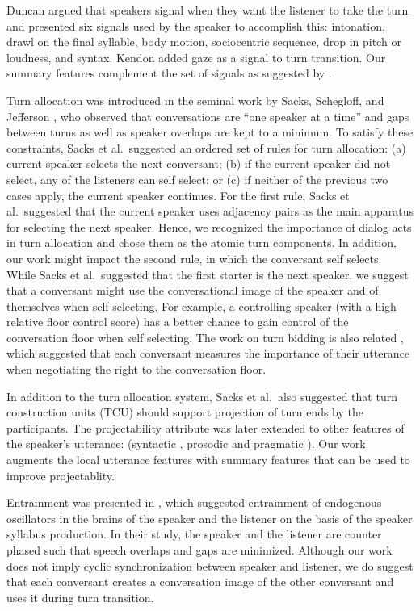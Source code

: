 Duncan \cite{duncan1972some} argued that speakers signal when they want the listener to take the turn and presented six signals used by the speaker to accomplish this: intonation, drawl on the final syllable, body motion, sociocentric sequence, drop in pitch or loudness, and syntax. Kendon \cite{kendon1967some} added gaze as a signal to turn transition. Our summary features complement the set of signals as suggested by \cite{duncan1972some}.


Turn allocation was introduced in the seminal work by Sacks, Schegloff, and Jefferson \cite{sacks1974simplest}, who observed that conversations are ``one speaker at a time'' and gaps between turns as well as speaker overlaps are kept to a minimum. To satisfy these constraints, Sacks et al.~suggested an ordered set of rules for turn allocation:
%
(a) current speaker selects the next conversant; (b) if the current speaker did not select, any of the listeners can self select; or (c) if neither of the previous two cases apply, the current speaker continues.
%
For the first rule, Sacks et al.~suggested that the current speaker uses adjacency pairs as the main apparatus for selecting the next speaker. Hence, we recognized the importance of dialog acts in turn allocation and chose them as the atomic turn components. In addition, our work might impact the second rule, in which the conversant self selects. While Sacks et al.~suggested that the first starter is the next speaker, we suggest that a conversant might use the conversational image of the speaker and of themselves when self selecting. For example, a controlling speaker (with a high relative floor control score) has a better chance to gain control of the conversation floor when self selecting.  The work on turn bidding is also related \cite{SelfridgeHeeman10:acl}, which suggested that each conversant measures the importance of their utterance when negotiating the right to the conversation floor.

In addition to the turn allocation system, Sacks et al.~also suggested that turn construction units (TCU) should support projection of turn ends by the participants. The projectability attribute was later extended to other features of the speaker's utterance: (syntactic \cite{sacks1974simplest}, prosodic \cite{ford1996interactional} and pragmatic \cite{ford1996interactional,ford2001intersection}). Our work augments the local utterance features with summary features that can be used to improve projectablity.

Entrainment was presented in \cite{wilson2005oscillator}, which suggested entrainment of endogenous oscillators in the brains of the speaker and the listener on the basis of the speaker syllabus production. In their study, the speaker and the listener are counter phased such that speech overlaps and gaps are minimized. Although our work does not imply cyclic synchronization between speaker and listener, we do suggest that each conversant creates a conversation image of the other conversant and uses it during turn transition.

